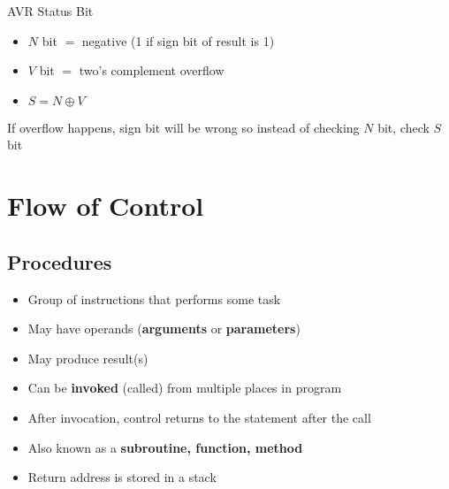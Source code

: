\begin{note}{AVR Status Bit}
	\begin{itemize}
		\item $N$ bit $=$ negative (1 if sign bit of result is 1)
		\item $V$ bit $=$ two's complement overflow
		\item $S=N\oplus V$	
	\end{itemize}
	If overflow happens, sign bit will be wrong so instead of checking $N$ bit, check $S$ bit
\end{note}

\section{Flow of Control}
\subsection{Procedures}
\begin{itemize}
	\item Group of instructions that performs some task
	\item May have operands (\textbf{arguments} or \textbf{parameters})
	\item May produce result(s)
	\item Can be \textbf{invoked} (called) from multiple places in program
	\item After invocation, control returns to the statement after the call
	\item Also known as a \textbf{subroutine, function, method}	
	\item Return address is stored in a stack
\end{itemize}
